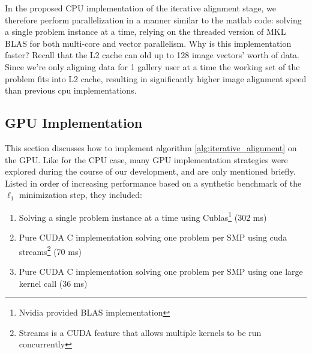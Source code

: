 \documentclass[10pt,twocolumn,letterpaper]{article}
\begin{document}
In the proposed CPU implementation of the iterative alignment stage, we
therefore perform parallelization in a manner similar to the matlab code:
solving a single problem instance at a time, relying on the threaded version of
MKL BLAS for both multi-core and vector parallelism.  Why is this
implementation faster?  Recall that the L2 cache can old up to 128 image
vectors' worth of data.  Since we're only aligning data for 1 gallery user at a
time the working set of the problem fits into L2 cache, resulting in
significantly higher image alignment speed than previous cpu implementations. 



\subsection{GPU Implementation}
\label{sec:alignment_implementation_gpu}

This section discusses how to implement algorithm
\eqref{alg:iterative_alignment} on the GPU.  Like for the CPU case, many GPU
implementation strategies were explored during the course of our development,
and are only mentioned briefly.  Listed in order of increasing performance
based on a synthetic benchmark of the $\ell_1$ minimization step, they
included:
\begin{enumerate}
\item Solving a single problem instance at a time using Cublas\footnote{Nvidia provided BLAS implementation} (302 ms)
\item Pure CUDA C implementation solving one problem per SMP using cuda streams\footnote{Streams is a CUDA feature that allows multiple
kernels to be run concurrently} (70 ms)
\item Pure CUDA C implementation solving one problem per SMP using one large kernel call (36 ms)
\end{enumerate}
\end{document}
